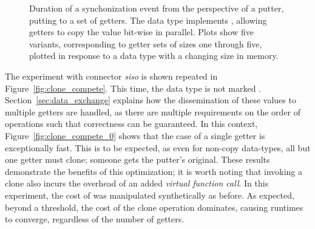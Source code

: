 \begin{figure}
{\begin{subfigure}[b]{0.63\textwidth}
			\caption{}
			\label{fig:simo_copy_1}
		\end{subfigure}%
	}
	\caption[Synchronization duration for SISO with copy-type data.]{Duration of a synchonization event from the perspective of a putter, putting to a set of getters. The data type implements , allowing getters to copy the value bit-wise in parallel. Plots show five variants, corresponding to getter sets of sizes one through five, plotted in response to a data type with a changing size in memory.}
	\label{fig:simo_copy}
\end{figure}



The experiment with connector \textit{siso} is shown repeated in Figure~\ref{fig:clone_compete}. This time, the data type is not marked . Section~\ref{sec:data_exchange} explains how the dissemination of these values to multiple getters are handled, as there are multiple requirements on the order of operations such that correctness can be guaranteed. In this context, Figure~\ref{fig:clone_compete_0} shows that the case of a single getter is exceptionally fast. This is to be expected, as even for non-copy data-types, all but one getter must clone; someone gets the putter's original. These results demonstrate the benefits of this optimization; it is worth noting that invoking a clone also incurs the overhead of an added \textit{virtual function call}.
In this experiment, the cost of  was manipulated synthetically as before. As expected, beyond a threshold, the cost of the clone operation dominates, causing runtimes to converge, regardless of the number of getters.



